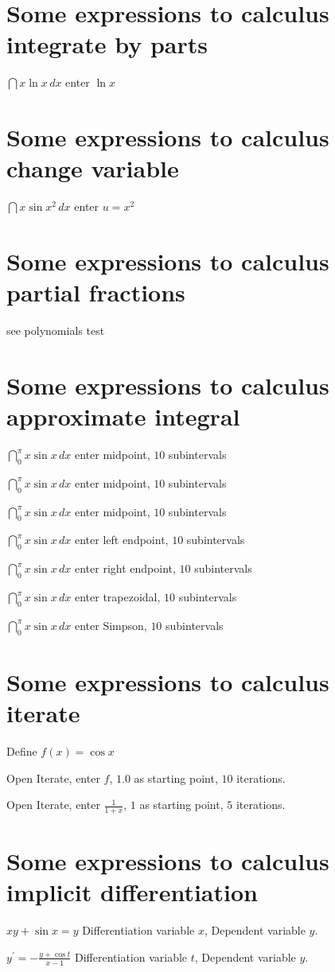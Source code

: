 \documentclass{article}
\begin{document}
\section{Some expressions to calculus integrate by parts}

$\dint x\ln x\,dx$ enter $\ln x$

\section{Some expressions to calculus change variable}

$\dint x\sin x^{2}\,dx$ enter $u=x^{2}$

\section{Some expressions to calculus partial fractions}

see polynomials test

\section{Some expressions to calculus approximate integral}

$\dint_{0}^{\pi }x\sin x\,dx$ enter midpoint, $10$ subintervals

$\dint_{0}^{\pi }x\sin x\,dx$ enter midpoint, $10$ subintervals

$\dint_{0}^{\pi }x\sin x\,dx$ enter midpoint, $10$ subintervals

$\dint_{0}^{\pi }x\sin x\,dx$ enter left endpoint, $10$ subintervals

$\dint_{0}^{\pi }x\sin x\,dx$ enter right endpoint, $10$ subintervals

$\dint_{0}^{\pi }x\sin x\,dx$ enter trapezoidal, $10$ subintervals

$\dint_{0}^{\pi }x\sin x\,dx$ enter Simpson, $10$ subintervals

\section{Some expressions to calculus iterate}

Define $f(x)=\cos x$

Open Iterate, enter $f$, $1.0$ as starting point, $10$ iterations.

Open Iterate, enter $\frac{1}{1+x}$, $1$ as starting point, $5$ iterations.

\section{Some expressions to calculus implicit differentiation}

$xy+\sin x=y$ Differentiation variable $x$, Dependent variable $y$.

$y^{\prime }=-\frac{y+\cos t}{x-1}$ Differentiation variable $t$, Dependent
variable $y$.
\end{document}
